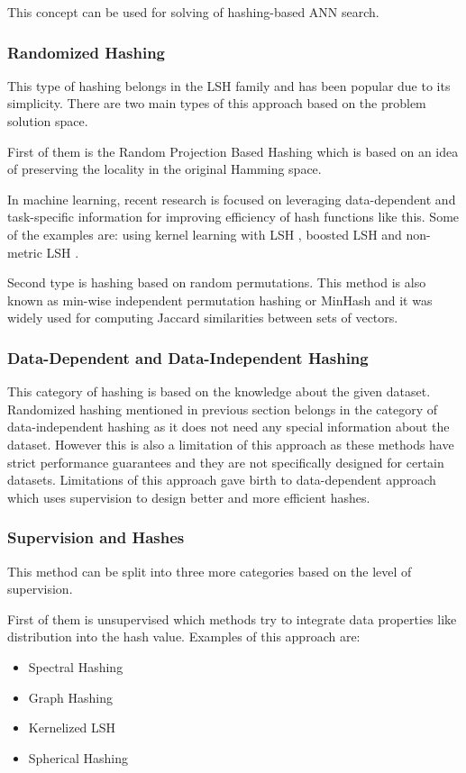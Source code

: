 This concept can be used for solving of hashing-based ANN search.

\subsubsection{Randomized Hashing}
This type of hashing belongs in the LSH family and has been popular due to its simplicity. There are two main types of this approach based on the problem solution space. 

First of them is the Random Projection Based Hashing which is based on an idea of preserving the locality in the original Hamming space.

In machine learning, recent research is focused on leveraging data-dependent and task-specific information for improving efficiency of hash functions like this. Some of the examples are: using kernel learning with LSH \cite{kernelLSH}, boosted LSH \cite{boostLSH} and non-metric LSH \cite{nonMLSH}.

Second type is hashing based on random permutations. This method is also known as min-wise independent permutation hashing or MinHash and it was widely used for computing Jaccard similarities between sets of vectors.

\subsubsection{Data-Dependent and Data-Independent Hashing}
This category of hashing is based on the knowledge about the given dataset. Randomized hashing mentioned in previous section belongs in the category of data-independent hashing as it does not need any special information about the dataset. However this is also a limitation of this approach as these methods have strict performance guarantees and they are not specifically designed for certain datasets. Limitations of this approach gave birth to data-dependent approach which uses supervision to design better and more efficient hashes. 

\subsubsection{Supervision and Hashes}
This method can be split into three more categories based on the level of supervision.

First of them is unsupervised which methods try to integrate data properties like distribution into the hash value. Examples of this approach are:
\begin{itemize}
\item Spectral Hashing
\item Graph Hashing
\item Kernelized LSH
\item Spherical Hashing
\end{itemize}


